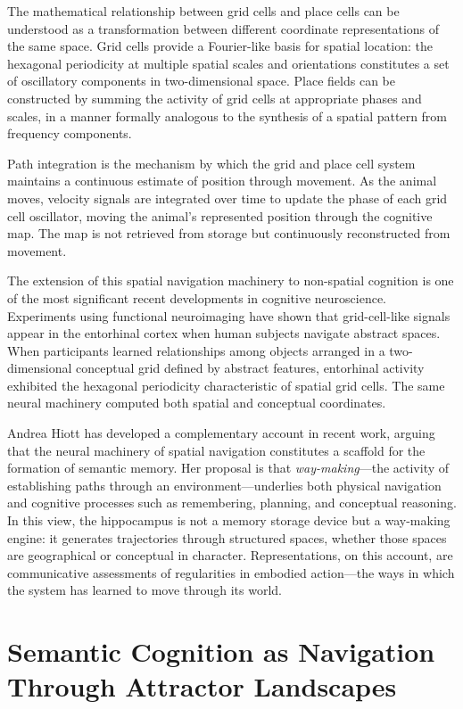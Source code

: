 \documentclass[11pt, a4paper]{article}
\theoremstyle{plain}
\theoremstyle{definition}
\theoremstyle{remark}
\begin{document}
The mathematical relationship between grid cells and place cells can be understood as a
transformation between different coordinate representations of the same space. Grid cells
provide a Fourier-like basis for spatial location: the hexagonal periodicity at multiple
spatial scales and orientations constitutes a set of oscillatory components in
two-dimensional space. Place fields can be constructed by summing the activity of grid
cells at appropriate phases and scales, in a manner formally analogous to the synthesis
of a spatial pattern from frequency components.

Path integration is the mechanism by which the grid and place cell system maintains a
continuous estimate of position through movement. As the animal moves, velocity signals
are integrated over time to update the phase of each grid cell oscillator, moving the
animal's represented position through the cognitive map. The map is not retrieved from
storage but continuously reconstructed from movement.

The extension of this spatial navigation machinery to non-spatial cognition is one of
the most significant recent developments in cognitive neuroscience. Experiments using
functional neuroimaging have shown that grid-cell-like signals appear in the entorhinal
cortex when human subjects navigate abstract spaces. When participants learned
relationships among objects arranged in a two-dimensional conceptual grid defined by
abstract features, entorhinal activity exhibited the hexagonal periodicity characteristic
of spatial grid cells. The same neural machinery computed both spatial and conceptual
coordinates.

Andrea Hiott has developed a complementary account in recent work, arguing that the
neural machinery of spatial navigation constitutes a scaffold for the formation of
semantic memory. Her proposal is that \emph{way-making}---the activity of establishing
paths through an environment---underlies both physical navigation and cognitive processes
such as remembering, planning, and conceptual reasoning. In this view, the hippocampus
is not a memory storage device but a way-making engine: it generates trajectories through
structured spaces, whether those spaces are geographical or conceptual in character.
Representations, on this account, are communicative assessments of regularities in
embodied action---the ways in which the system has learned to move through its world.


\section{Semantic Cognition as Navigation Through Attractor Landscapes}
\end{document}
